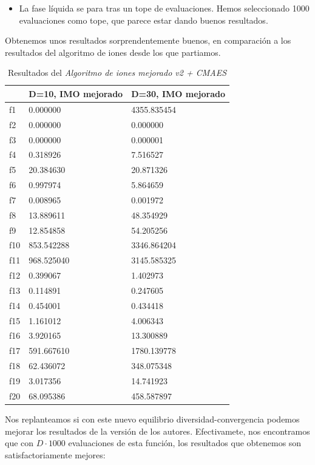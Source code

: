 \documentclass[a4paper,11pt]{article}
\begin{document}
\begin{itemize}
\begin{itemize}
  \item La fase líquida se para tras un tope de evaluaciones. Hemos seleccionado 1000 evaluaciones como tope, que parece
  estar dando buenos resultados.
 \end{itemize}
 
  Obtenemos unos resultados sorprendentemente buenos, en comparación a los resultados del
 algoritmo de iones desde los que partiamos. 
 
  \begin{table}[H]	
  \caption{Resultados del \textit{Algoritmo de iones mejorado v2 + CMAES}}
  \centering
  \begin{tabular}{|l|l|l|}
  \hline
  & \textbf{D=10, IMO mejorado} & \textbf{D=30, IMO mejorado} \\ \hline
  f1 &  0.000000 &  4355.835454 \\ \hline
  f2 &  0.000000 &  0.000000 \\ \hline
  f3 &  0.000000 &  0.000001 \\ \hline
  f4 &  0.318926 &  7.516527 \\ \hline
  f5 &  20.384630 &  20.871326 \\ \hline
  f6 &  0.997974 &  5.864659 \\ \hline
  f7 &  0.008965 &  0.001972 \\ \hline
  f8 &  13.889611 &  48.354929 \\ \hline
  f9 &  12.854858 &  54.205256 \\ \hline
  f10 &  853.542288 &  3346.864204 \\ \hline
  f11 &  968.525040 &  3145.585325 \\ \hline
  f12 &  0.399067 &  1.402973 \\ \hline
  f13 &  0.114891 &  0.247605 \\ \hline
  f14 &  0.454001 &  0.434418 \\ \hline
  f15 &  1.161012 &  4.006343 \\ \hline
  f16 &  3.920165 &  13.300889 \\ \hline
  f17 &  591.667610 &  1780.139778 \\ \hline
  f18 &  62.436072 &  348.075348 \\ \hline
  f19 &  3.017356 &  14.741923 \\ \hline
  f20 &  68.095386 &  458.587897 \\ \hline
  \end{tabular}
  \end{table}
  
  Nos replanteamos si con este nuevo equilibrio diversidad-convergencia podemos mejorar los resultados de la versión de los autores.
  Efectivamete, nos encontramos que con $D\cdot 1000$ evaluaciones de esta función, los resultados que obtenemos son satisfactoriamente
  mejores:
  

\end{itemize}
\end{document}
